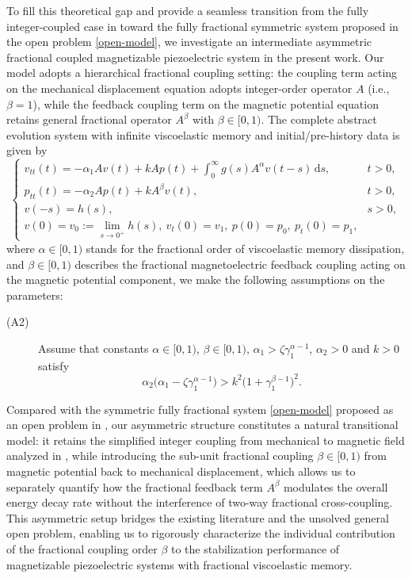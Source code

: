 \documentclass[12pt,reqno]{article}
\begin{document}
To fill this theoretical gap and provide a seamless transition from the fully integer-coupled case in \cite{MR4939108} toward the fully fractional symmetric system proposed in the open problem \eqref{open-model}, we investigate an intermediate asymmetric fractional coupled magnetizable piezoelectric system in the present work. Our model adopts a hierarchical fractional coupling setting: the coupling term acting on the mechanical displacement equation adopts integer-order operator $A$ (i.e., $\beta=1$), while the feedback coupling term on the magnetic potential equation retains general fractional operator $A^\beta$ with $\beta\in[0,1)$. The complete abstract evolution system with infinite viscoelastic memory and initial/pre-history data is given by
\begin{equation}\label{model}
		\begin{cases}
			\displaystyle v_{tt}(t) = -\alpha_1 A v(t) + k A p(t) + \int_0^\infty g(s) A^\alpha v(t-s) \,\mathrm{d}s, & t>0, \\
			p_{tt}(t) = -\alpha_2 A p(t) + k A^\beta v(t), & t>0 ,\\
			v(-s) = h(s), & s>0, \\
			v(0)=v_0:=\lim_{s\to0^+}h(s),\ v_t(0)=v_1,\ p(0)=p_0,\ p_t(0)=p_1,
		\end{cases}
	\end{equation}
where $\alpha\in[0,1)$ stands for the fractional order of viscoelastic memory dissipation, and $\beta\in[0,1)$ describes the fractional magnetoelectric feedback coupling acting on the magnetic potential component, we make the following assumptions on the parameters:
 \begin{description}
\item[(A2)]
		Assume that constants $\alpha\in[0,1)$, $\beta\in[0,1)$, $\alpha_1>\zeta\gamma_1^{\alpha-1}$, $\alpha_2>0$ and $k>0$ satisfy
		\[
		\alpha_2\big(\alpha_1 - \zeta \gamma_1^{\alpha-1}\big)
		> k^2\big(1 + \gamma_1^{\beta-1}\big)^2.
		\]
 \end{description}


 Compared with the symmetric fully fractional system \eqref{open-model} proposed as an open problem in \cite{MR4450079}, our asymmetric structure constitutes a natural transitional model: it retains the simplified integer coupling from mechanical to magnetic field analyzed in \cite{MR4939108}, while introducing the sub-unit fractional coupling $\beta\in[0,1)$ from magnetic potential back to mechanical displacement, which allows us to separately quantify how the fractional feedback term $A^\beta$ modulates the overall energy decay rate without the interference of two-way fractional cross-coupling. This asymmetric setup bridges the existing literature and the unsolved general open problem, enabling us to rigorously characterize the individual contribution of the fractional coupling order $\beta$ to the stabilization performance of magnetizable piezoelectric systems with fractional viscoelastic memory.
\end{document}
